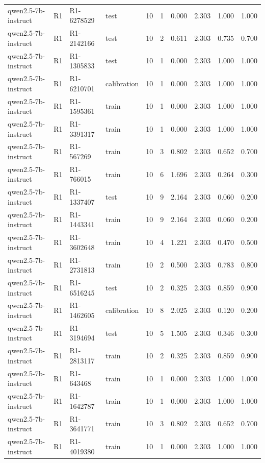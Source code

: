 \begin{table}
\begin{tabular}{llllrrrrrr}
qwen2.5-7b-instruct & R1 & R1-6278529 & test & 10 & 1 & 0.000 & 2.303 & 1.000 & 1.000 \\
qwen2.5-7b-instruct & R1 & R1-2142166 & test & 10 & 2 & 0.611 & 2.303 & 0.735 & 0.700 \\
qwen2.5-7b-instruct & R1 & R1-1305833 & test & 10 & 1 & 0.000 & 2.303 & 1.000 & 1.000 \\
qwen2.5-7b-instruct & R1 & R1-6210701 & calibration & 10 & 1 & 0.000 & 2.303 & 1.000 & 1.000 \\
qwen2.5-7b-instruct & R1 & R1-1595361 & train & 10 & 1 & 0.000 & 2.303 & 1.000 & 1.000 \\
qwen2.5-7b-instruct & R1 & R1-3391317 & train & 10 & 1 & 0.000 & 2.303 & 1.000 & 1.000 \\
qwen2.5-7b-instruct & R1 & R1-567269 & train & 10 & 3 & 0.802 & 2.303 & 0.652 & 0.700 \\
qwen2.5-7b-instruct & R1 & R1-766015 & train & 10 & 6 & 1.696 & 2.303 & 0.264 & 0.300 \\
qwen2.5-7b-instruct & R1 & R1-1337407 & test & 10 & 9 & 2.164 & 2.303 & 0.060 & 0.200 \\
qwen2.5-7b-instruct & R1 & R1-1443341 & train & 10 & 9 & 2.164 & 2.303 & 0.060 & 0.200 \\
qwen2.5-7b-instruct & R1 & R1-3602648 & train & 10 & 4 & 1.221 & 2.303 & 0.470 & 0.500 \\
qwen2.5-7b-instruct & R1 & R1-2731813 & train & 10 & 2 & 0.500 & 2.303 & 0.783 & 0.800 \\
qwen2.5-7b-instruct & R1 & R1-6516245 & test & 10 & 2 & 0.325 & 2.303 & 0.859 & 0.900 \\
qwen2.5-7b-instruct & R1 & R1-1462605 & calibration & 10 & 8 & 2.025 & 2.303 & 0.120 & 0.200 \\
qwen2.5-7b-instruct & R1 & R1-3194694 & test & 10 & 5 & 1.505 & 2.303 & 0.346 & 0.300 \\
qwen2.5-7b-instruct & R1 & R1-2813117 & train & 10 & 2 & 0.325 & 2.303 & 0.859 & 0.900 \\
qwen2.5-7b-instruct & R1 & R1-643468 & train & 10 & 1 & 0.000 & 2.303 & 1.000 & 1.000 \\
qwen2.5-7b-instruct & R1 & R1-1642787 & train & 10 & 1 & 0.000 & 2.303 & 1.000 & 1.000 \\
qwen2.5-7b-instruct & R1 & R1-3641771 & train & 10 & 3 & 0.802 & 2.303 & 0.652 & 0.700 \\
qwen2.5-7b-instruct & R1 & R1-4019380 & train & 10 & 1 & 0.000 & 2.303 & 1.000 & 1.000 \\

\end{tabular}
\end{table}
